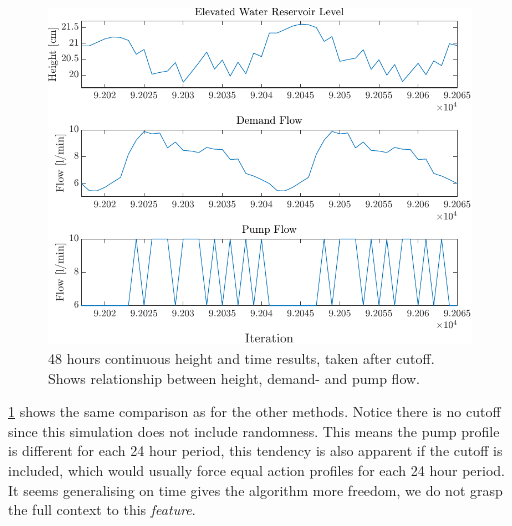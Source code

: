 \begin{figure}[h!]
	\centering
	\includegraphics[width=0.7\linewidth]{figures/DoubleContResults2.pdf}
	\caption{48 hours continuous height and time results, taken after cutoff. Shows relationship between height, demand- and pump flow.}
	\label{fig:DoubleContResults2}
\end{figure} 

\cref{fig:DoubleContResults2} shows the same comparison as for the other methods. Notice there is no cutoff since this simulation does not include randomness. This means the pump profile is different for each 24 hour period, this tendency is also apparent if the cutoff is included, which would usually force equal action profiles for each 24 hour period. It seems generalising on time gives the algorithm more freedom, we do not grasp the full context to this \textit{feature}.

